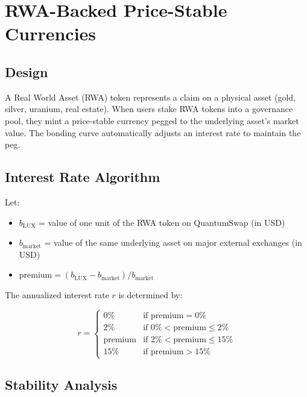\section{RWA-Backed Price-Stable Currencies}


\subsection{Design}

A Real World Asset (RWA) token represents a claim on a physical
asset (gold, silver, uranium, real estate). When users stake RWA tokens
into a governance pool, they mint a price-stable currency pegged to
the underlying asset's market value. The bonding curve automatically
adjusts an interest rate to maintain the peg.

\subsection{Interest Rate Algorithm}\label{sec:interest}

Let:
\begin{itemize}[nosep]
  \item $b_{\text{LUX}}$ = value of one unit of the RWA token on
        QuantumSwap (in USD)
  \item $b_{\text{market}}$ = value of the same underlying asset on
        major external exchanges (in USD)
  \item $\text{premium} = (b_{\text{LUX}} - b_{\text{market}}) /
        b_{\text{market}}$
\end{itemize}

The annualized interest rate $r$ is determined by:

\begin{equation}\label{eq:interest-rate}
r = \begin{cases}
  0\%   & \text{if } \text{premium} = 0\% \\
  2\%   & \text{if } 0\% < \text{premium} \leq 2\% \\
  \text{premium} & \text{if } 2\% < \text{premium} \leq 15\% \\
  15\%  & \text{if } \text{premium} > 15\%
\end{cases}
\end{equation}

\subsection{Stability Analysis}


